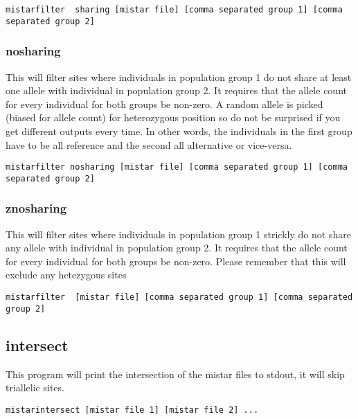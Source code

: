 \documentclass[a4paper]{article}
\begin{document}
\tiny
\begin{verbatim}
mistarfilter  sharing [mistar file] [comma separated group 1] [comma separated group 2]
\end{verbatim}
\normalsize

\subsubsection{nosharing}


This will filter sites where individuals in population group 1 do not share at least one allele with individual in population group 2.
It requires that the allele count for every individual for both groups be non-zero.
A random allele is picked (biased for allele count) for heterozygous position so do not be surprised if you get different outputs every time.
In other words, the individuals in the first group have to be all reference and the second all alternative or vice-versa.

\tiny
\begin{verbatim}
mistarfilter nosharing [mistar file] [comma separated group 1] [comma separated group 2]
\end{verbatim}
\normalsize

\subsubsection{znosharing}
This will filter sites where individuals in population group 1 strickly do not share any allele with individual in population group 2.
It requires that the allele count for every individual for both groups be non-zero.
Please remember that this will exclude any hetezygous sites

\small
\begin{verbatim}
mistarfilter  [mistar file] [comma separated group 1] [comma separated group 2]
\end{verbatim}
\normalsize




\subsection{intersect}

This program will print the intersection of the mistar files to stdout, it will skip triallelic sites.

\begin{verbatim}
mistarintersect [mistar file 1] [mistar file 2] ...
\end{verbatim}
\end{document}
